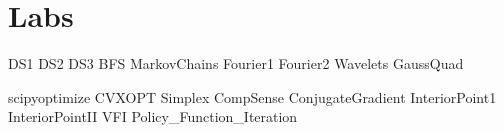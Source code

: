 \documentclass[nociteref]{SIAM-GH-book}
\begin{document}
\part{Labs} %
{DS1}
{DS2}
{DS3}
{BFS}
{MarkovChains}
{Fourier1}
{Fourier2}
{Wavelets}
{GaussQuad}

{scipyoptimize}
{CVXOPT}
{Simplex}
{CompSense} %
{ConjugateGradient}
{InteriorPoint1}
{InteriorPointII}
{VFI}
{Policy_Function_Iteration}
\end{document}

